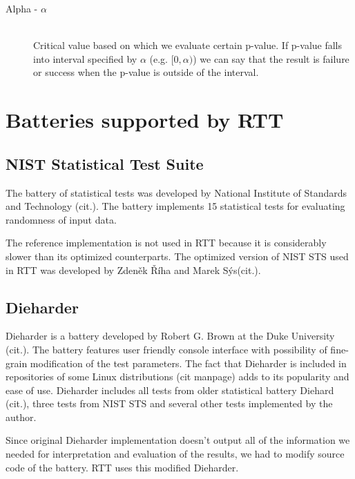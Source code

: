 \documentclass[
  digital,  	%
  color,		%
  oneside,   	%
  12pt,
  nocover,
  notable,
  nolof,
  nolot,
]{fithesis3}
\begin{document}
\begin{description}
\item[Alpha - $\alpha$] \hfill \\
Critical value based on which we evaluate certain p-value. If p-value falls into interval specified by $\alpha$ (e.g. $[0,\alpha)$) we can say that the result is failure or success when the p-value is outside of the interval.
\end{description}

\section{Batteries supported by RTT}
\subsection{NIST Statistical Test Suite}
The battery of statistical tests was developed by National Institute of Standards and Technology (cit.). The battery implements 15 statistical tests for evaluating randomness of input data.

The reference implementation is not used in RTT because it is considerably slower than its optimized counterparts. The optimized version of NIST STS used in RTT was developed by Zdeněk Říha and Marek Sýs(cit.). 

\subsection{Dieharder}
Dieharder is a battery developed by Robert G. Brown at the Duke University (cit.). The battery features user friendly console interface with possibility of fine-grain modification of the test parameters. The fact that Dieharder is included in repositories of some Linux distributions (cit manpage) adds to its popularity and ease of use. Dieharder includes all tests from older statistical battery Diehard (cit.), three tests from NIST STS and several other tests implemented by the author. 

Since original Dieharder implementation doesn't output all of the information we needed for interpretation and evaluation of the results, we had to modify source code of the battery. RTT uses this modified Dieharder.
\end{document}
